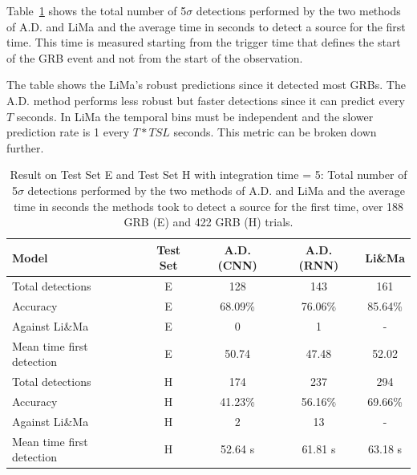 Table~\ref{tab:Experiment-Results-E-IT-5} shows the total number of 5$\sigma$ detections performed by the two methods of A.D. and LiMa and the average time in seconds to detect a source for the first time. This time is measured starting from the trigger time that defines the start of the GRB event and not from the start of the observation.

The table shows the LiMa's robust predictions since it detected most GRBs. The A.D. method performs less robust but faster detections since it can predict every $T$ seconds. In LiMa the temporal bins must be independent and the slower prediction rate is 1  every $T*TSL$ seconds. This metric can be broken down further.


\begin{table}[ht]
\centering %
\begin{tabular}{l c c c c} %
\hline\hline %
Model & Test Set & A.D. (CNN) & A.D. (RNN) & Li\&Ma \\ [0.5ex] %
\hline %
Total detections & E & 128 & 143 & 161 \\ 
Accuracy & E &  68.09\% & 76.06\% & 85.64\%  \\ 
Against Li\&Ma & E &  0 & 1 & - \\ 
Mean time first detection & E &  50.74 & 47.48 & 52.02  \\ [1ex] %

\hline %
Total detections & H &  174 & 237 & 294 \\
Accuracy & H & 41.23\% & 56.16\% & 69.66\%  \\ 
Against Li\&Ma & H & 2 & 13 & - \\  
Mean time first detection & H & 52.64 s & 61.81 s & 63.18 s \\ [1ex]   

\hline %
\end{tabular}
\caption{Result on Test Set E and Test Set H with integration time = 5: Total number of 5$\sigma$ detections performed by the two methods of A.D. and LiMa and the average time in seconds the methods took to detect a source for the first time, over 188 GRB (E) and 422 GRB (H) trials.}
\label{tab:Experiment-Results-E-IT-5} 
\end{table}



